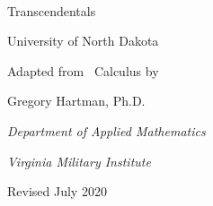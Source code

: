 


\begin{flushright}

\label{coverpagetitle}
\\

\iftoggle{isEarlyTrans}{Early}{Late} Transcendentals \\

%

{\Large University of North Dakota}\bigskip

\normalsize

Adapted from \apex\ Calculus by

Gregory Hartman, Ph.D.

\emph{\small Department of Applied Mathematics}

\emph{\small Virginia Military Institute}

%

{\small Revised July 2020\forwhom}

\end{flushright}
\normalsize

\restoregeometry
